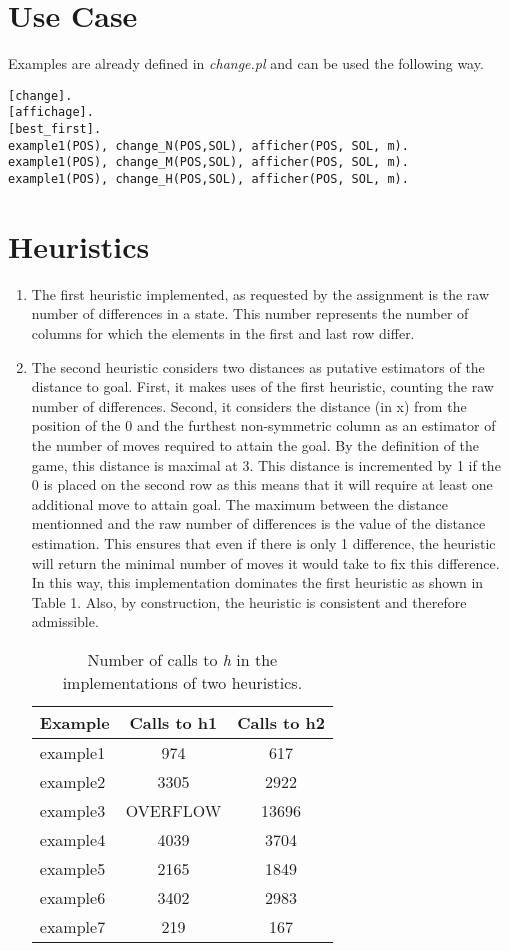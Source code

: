 \documentclass[12pt]{article}
\begin{document}
\section{Use Case}
Examples are already defined in \textit{change.pl} and can be used the following way.
\begin{verbatim}
[change].
[affichage].
[best_first].
example1(POS), change_N(POS,SOL), afficher(POS, SOL, m).
example1(POS), change_M(POS,SOL), afficher(POS, SOL, m).
example1(POS), change_H(POS,SOL), afficher(POS, SOL, m).
\end{verbatim}
\section{Heuristics}
\begin{enumerate}[(1)]
\item
The first heuristic implemented, as requested by the assignment is the raw number of differences in a state.  This number represents the number of columns for which the elements in the first and last row differ.
\item
The second heuristic considers two distances as putative estimators of the distance to goal.  First, it makes uses of the first heuristic, counting the raw number of differences.  Second, it considers the distance (in x) from the position of the 0 and the furthest non-symmetric column as an estimator of the number of moves required to attain the goal.  By the definition of the game, this distance is maximal at 3.  This distance is incremented by 1 if the 0 is placed on the second row as this means that it will require at least one additional move to attain goal.  The maximum between the distance mentionned and the raw number of differences is the value of the distance estimation.  This ensures that even if there is only 1 difference, the heuristic will return the minimal number of moves it would take to fix this difference.  In this way, this implementation dominates the first heuristic as shown in Table 1.  Also, by construction, the heuristic is consistent and therefore admissible.\\
 
\begin{table}[h!]
\begin{center}
\begin{tabular} {| l || c | c |}
\hline
Example & Calls to h1 & Calls to h2 \\
\hline
example1 & 974 & 617 \\
example2 & 3305 & 2922 \\
example3 & OVERFLOW & 13696 \\
example4 & 4039 & 3704\\
example5 & 2165 & 1849 \\
example6 & 3402 & 2983\\
example7 & 219 & 167\\
\hline
\end{tabular}
\caption{Number of calls to \textit{h} in the implementations of two heuristics.}
\end{center}
\end{table}
\end{enumerate}
\end{document}
